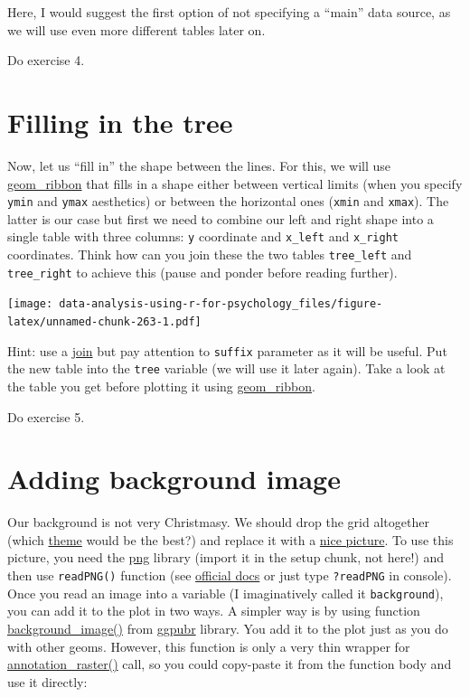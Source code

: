 \documentclass[
]{book}
\begin{document}
Here, I would suggest the first option of not specifying a ``main'' data source, as we will use even more different tables later on.

Do exercise 4.

\hypertarget{filling-in-the-tree}{%
\section{Filling in the tree}\label{filling-in-the-tree}}

Now, let us ``fill in'' the shape between the lines. For this, we will use \href{https://ggplot2.tidyverse.org/reference/geom_ribbon.html}{geom\_ribbon} that fills in a shape either between vertical limits (when you specify \texttt{ymin} and \texttt{ymax} aesthetics) or between the horizontal ones (\texttt{xmin} and \texttt{xmax}). The latter is our case but first we need to combine our left and right shape into a single table with three columns: \texttt{y} coordinate and \texttt{x\_left} and \texttt{x\_right} coordinates. Think how can you join these the two tables \texttt{tree\_left} and \texttt{tree\_right} to achieve this (pause and ponder before reading further).

\texttt{[image: data-analysis-using-r-for-psychology\_files/figure-latex/unnamed-chunk-263-1.pdf]}

Hint: use a \href{https://dplyr.tidyverse.org/reference/mutate-joins.html}{join} but pay attention to \texttt{suffix} parameter as it will be useful. Put the new table into the \texttt{tree} variable (we will use it later again). Take a look at the table you get before plotting it using \href{https://ggplot2.tidyverse.org/reference/geom_ribbon.html}{geom\_ribbon}.

Do exercise 5.

\hypertarget{adding-background-image}{%
\section{Adding background image}\label{adding-background-image}}

Our background is not very Christmasy. We should drop the grid altogether (which \href{https://ggplot2.tidyverse.org/reference/ggtheme.html}{theme} would be the best?) and replace it with a \href{images/christmas-background.png}{nice picture}. To use this picture, you need the \href{https://cran.r-project.org/package=png}{png} library (import it in the setup chunk, not here!) and then use \texttt{readPNG()} function (see \href{https://cran.r-project.org/web/packages/png/png.pdf}{official docs} or just type \texttt{?readPNG} in console). Once you read an image into a variable (I imaginatively called it \texttt{background}), you can add it to the plot in two ways. A simpler way is by using function \href{https://rpkgs.datanovia.com/ggpubr/reference/background_image.html}{background\_image()} from \href{https://rpkgs.datanovia.com/ggpubr/}{ggpubr} library. You add it to the plot just as you do with other geoms. However, this function is only a very thin wrapper for \href{https://ggplot2.tidyverse.org/reference/annotation_raster.html}{annotation\_raster()} call, so you could copy-paste it from the function body and use it directly:
\end{document}
